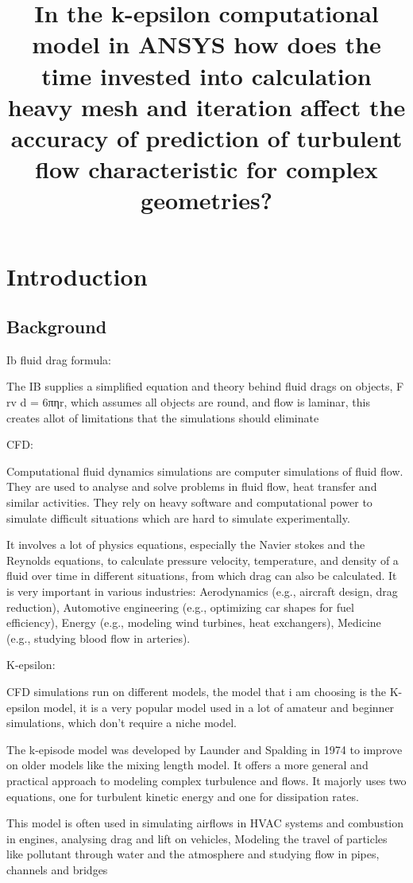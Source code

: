 \documentclass[12pt,a4paper]{article}
\title{In the k-epsilon computational model in ANSYS how does the time invested into calculation heavy mesh and iteration affect the accuracy of prediction of turbulent flow characteristic for complex geometries?}
\author{}
\date{}
\begin{document}
\maketitle

\section{Introduction}

\subsection{Background}

Ib fluid drag formula:

The IB supplies a simplified equation and theory behind fluid drags on objects, F rv d = 6πηr, which assumes all objects are round, and flow is laminar, this creates allot of limitations that the simulations should eliminate

CFD: 

Computational fluid dynamics simulations are computer simulations of fluid flow. They are used to analyse and solve problems in fluid flow, heat transfer and similar activities. They rely on heavy software and computational power to simulate difficult situations which are hard to simulate experimentally. 

It involves a lot of physics equations, especially the Navier stokes and the Reynolds equations, to calculate pressure velocity, temperature, and density of a fluid over time in different situations, from which drag can also be calculated. It is very important in various industries: Aerodynamics (e.g., aircraft design, drag reduction), Automotive engineering (e.g., optimizing car shapes for fuel efficiency), Energy (e.g., modeling wind turbines, heat exchangers), Medicine (e.g., studying blood flow in arteries).

K-epsilon:

CFD simulations run on different models, the model that i am choosing is the K-epsilon model, it is a very popular model used in a lot of amateur and beginner simulations, which don't require a niche model.

The k-episode model was developed by Launder and Spalding in 1974 to improve on older models like the mixing length model. It offers a more general and practical approach to modeling complex turbulence and flows. It majorly uses two equations, one for turbulent kinetic energy and one for dissipation rates.

This model is often used in simulating airflows in HVAC systems and combustion in engines, analysing drag and lift on vehicles, Modeling the travel of particles like pollutant through water and the atmosphere and studying flow in pipes, channels and bridges
\end{document}
